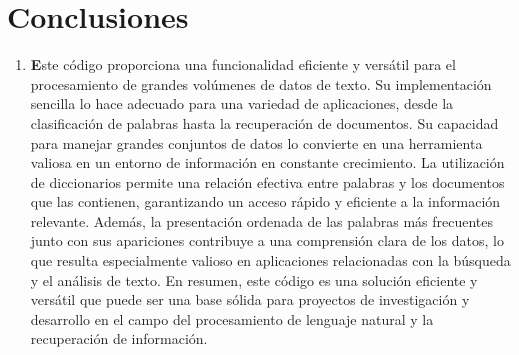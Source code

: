\documentclass[conference]{IEEEtran}
\begin{document}
\section{Conclusiones}
\begin{enumerate}
  \item \textbf Este código proporciona una funcionalidad eficiente y versátil para el procesamiento de grandes volúmenes de datos de texto. Su implementación sencilla lo hace adecuado para una variedad de aplicaciones, desde la clasificación de palabras hasta la recuperación de documentos. Su capacidad para manejar grandes conjuntos de datos lo convierte en una herramienta valiosa en un entorno de información en constante crecimiento. La utilización de diccionarios permite una relación efectiva entre palabras y los documentos que las contienen, garantizando un acceso rápido y eficiente a la información relevante. Además, la presentación ordenada de las palabras más frecuentes junto con sus apariciones contribuye a una comprensión clara de los datos, lo que resulta especialmente valioso en aplicaciones relacionadas con la búsqueda y el análisis de texto. En resumen, este código es una solución eficiente y versátil que puede ser una base sólida para proyectos de investigación y desarrollo en el campo del procesamiento de lenguaje natural y la recuperación de información.






\end{enumerate}
\end{document}
